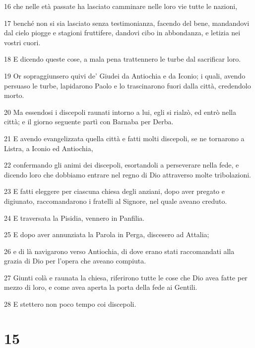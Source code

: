 \par 16 che nelle età passate ha lasciato camminare nelle loro vie tutte le nazioni,
\par 17 benché non si sia lasciato senza testimonianza, facendo del bene, mandandovi dal cielo piogge e stagioni fruttifere, dandovi cibo in abbondanza, e letizia nei vostri cuori.
\par 18 E dicendo queste cose, a mala pena trattennero le turbe dal sacrificar loro.
\par 19 Or sopraggiunsero quivi de' Giudei da Antiochia e da Iconio; i quali, avendo persuaso le turbe, lapidarono Paolo e lo trascinarono fuori dalla città, credendolo morto.
\par 20 Ma essendosi i discepoli raunati intorno a lui, egli si rialzò, ed entrò nella città; e il giorno seguente partì con Barnaba per Derba.
\par 21 E avendo evangelizzata quella città e fatti molti discepoli, se ne tornarono a Listra, a Iconio ed Antiochia,
\par 22 confermando gli animi dei discepoli, esortandoli a perseverare nella fede, e dicendo loro che dobbiamo entrare nel regno di Dio attraverso molte tribolazioni.
\par 23 E fatti eleggere per ciascuna chiesa degli anziani, dopo aver pregato e digiunato, raccomandarono i fratelli al Signore, nel quale aveano creduto.
\par 24 E traversata la Pisidia, vennero in Panfilia.
\par 25 E dopo aver annunziata la Parola in Perga, discesero ad Attalia;
\par 26 e di là navigarono verso Antiochia, di dove erano stati raccomandati alla grazia di Dio per l'opera che aveano compiuta.
\par 27 Giunti colà e raunata la chiesa, riferirono tutte le cose che Dio avea fatte per mezzo di loro, e come avea aperta la porta della fede ai Gentili.
\par 28 E stettero non poco tempo coi discepoli.

\chapter{15}

